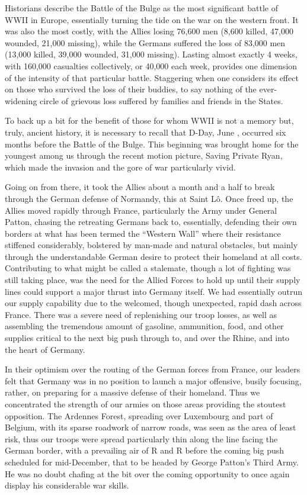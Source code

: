 \documentclass[../m3y]{subfiles}
\begin{document}
Historians describe the Battle of the Bulge as the most significant battle of WW\thinspace{}II in Europe, essentially turning the tide on the war on the western front. It was also the most costly, with the Allies losing 76,600 men (8,600 killed, 47,000 wounded, 21,000 missing), while the Germans suffered the loss of 83,000 men (13,000 killed, 39,000 wounded, 31,000 missing). Lasting almost exactly 4 weeks, with 160,000 casualties collectively, or 40,000 each week, provides one dimension of the intensity of that particular battle. Staggering when one considers its effect on those who survived the loss of their buddies, to say nothing of the ever-widening circle of grievous loss suffered by families and friends in the States.

To back up a bit for the benefit of those for whom WW\thinspace{}II is not a memory but, truly, ancient history, it is necessary to recall that D-Day, June , occurred six months before the Battle of the Bulge. This beginning was brought home for the youngest among us through the recent motion picture, Saving Private Ryan, which made the invasion and the gore of war particularly vivid.

Going on from there, it took the Allies about a month and a half to break through the German defense of Normandy, this at Saint L\^o. Once freed up, the Allies moved rapidly through France, particularly the  Army under General Patton, chasing the retreating Germans back to, essentially, defending their own borders at what has been termed the ``Western Wall'' where their resistance stiffened considerably, bolstered by man-made and natural obstacles, but mainly through the understandable German desire to protect their homeland at all costs. Contributing to what might be called a stalemate, though a lot of fighting was still taking place, was the need for the Allied Forces to hold up until their supply lines could support a major thrust into Germany itself. We had essentially outrun our supply capability due to the welcomed, though unexpected, rapid dash across France. There was a severe need of replenishing our troop losses, as well as assembling the tremendous amount of gasoline, ammunition, food, and other supplies critical to the next big push through to, and over the Rhine, and into the heart of Germany.

In their optimism over the routing of the German forces from France, our leaders felt that Germany was in no position to launch a major offensive, busily focusing, rather, on preparing for a massive defense of their homeland. Thus we concentrated the strength of our armies on those areas providing the stoutest opposition. The Ardennes Forest, spreading over Luxembourg and part of Belgium, with its sparse roadwork of narrow roads, was seen as the area of least risk, thus our troops were spread particularly thin along the line facing the German border, with a prevailing air of R and R before the coming big push scheduled for mid-December, that to be headed by George Patton's Third Army. He was no doubt chafing at the bit over the coming opportunity to once again display his considerable war skills.
\end{document}
